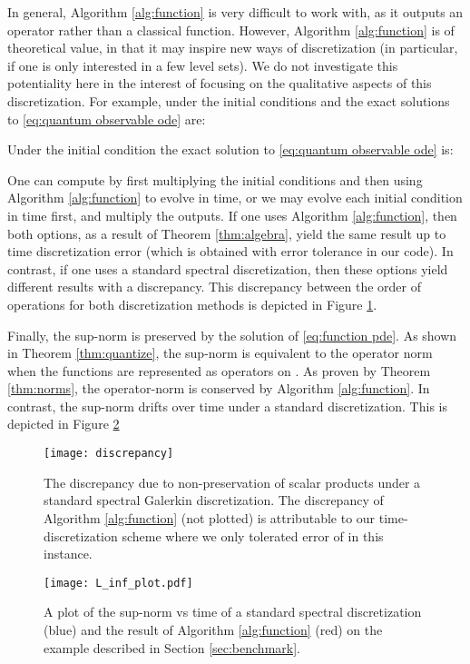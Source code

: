 \documentclass[final,leqno]{amsart}
\begin{document}
In general, Algorithm \ref{alg:function} is very difficult to work with, as it outputs an operator rather than a classical function.
However, Algorithm \ref{alg:function} is of theoretical value, in that it may inspire new ways of discretization (in particular, if one is only interested in a few level sets).
We do not investigate this potentiality here in the interest of focusing on the qualitative aspects of this discretization.
For example, under the initial conditions  and  the exact solutions to \eqref{eq:quantum observable ode} are:

Under the initial condition  the exact solution to \eqref{eq:quantum observable ode} is:

One can compute  by first multiplying the initial conditions and then using Algorithm \ref{alg:function} to evolve in time, or we may evolve each initial condition in time first, and multiply the outputs.
If one uses Algorithm \ref{alg:function}, then both options, as a result of Theorem \ref{thm:algebra}, yield the same result up to time discretization error (which is obtained with error tolerance  in our code).
In contrast, if one uses a standard spectral discretization, then these options yield different results with a discrepancy.
This discrepancy between the order of operations for both discretization methods is depicted in Figure \ref{fig:discrepancy}.

Finally, the sup-norm is preserved by the solution of \eqref{eq:function pde}.
As shown in Theorem \ref{thm:quantize}, the sup-norm is equivalent to the operator norm when the functions are represented as operators on .
As proven by Theorem \ref{thm:norms}, the operator-norm is conserved by Algorithm \ref{alg:function}.
In contrast, the sup-norm drifts over time under a standard discretization.  
This is depicted in Figure \ref{fig:norms}

\begin{figure}[h!]
	\hspace*{-1.2cm}
	\texttt{[image: discrepancy]}
	\caption{The discrepancy due to non-preservation of scalar products under a standard spectral Galerkin discretization. 
	The discrepancy of Algorithm \ref{alg:function} (not plotted) is attributable to our time-discretization scheme where we only tolerated error of  in this instance.}
	\label{fig:discrepancy}
\end{figure}  

\begin{figure}[h!]
	\hspace*{-1.2cm}
	\centering
	\texttt{[image: L\_inf\_plot.pdf]}
	\caption{A plot of the sup-norm vs time of a standard spectral discretization (blue) and the result of Algorithm \ref{alg:function} (red) on the example described in Section \ref{sec:benchmark}.}
	\label{fig:norms}
\end{figure}
\end{document}
